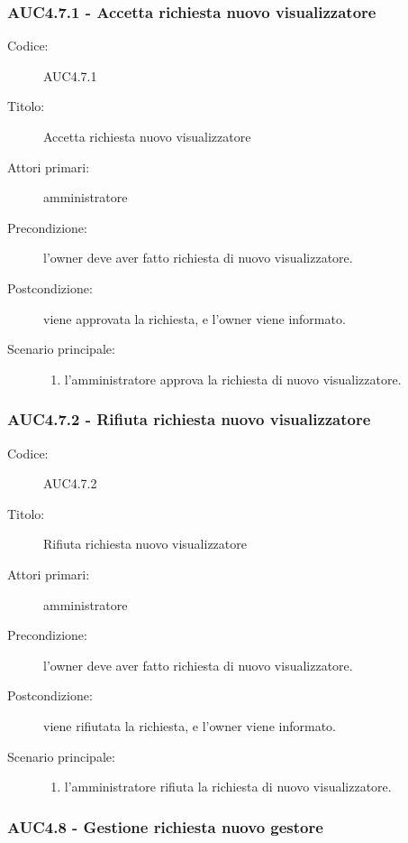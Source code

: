 \documentclass[casi-duso]{subfiles}
\begin{document}
\subsubsection{AUC4.7.1 - Accetta richiesta nuovo visualizzatore}%
\label{subsub:AUC4.7.1}
\begin{description}
  \item[Codice:] AUC4.7.1
  \item[Titolo:] Accetta richiesta nuovo visualizzatore
  \item[Attori primari:] amministratore
  \item[Precondizione:] l'owner deve aver fatto richiesta di nuovo visualizzatore.
  \item[Postcondizione:] viene approvata la richiesta, e l'owner viene informato.
  \item[Scenario principale:]
  \begin{enumerate}
    \item l'amministratore approva la richiesta di nuovo visualizzatore.
  \end{enumerate}
\end{description}  

\subsubsection{AUC4.7.2 - Rifiuta richiesta nuovo visualizzatore}%
\label{subsub:AUC4.7.2}
\begin{description}
  \item[Codice:] AUC4.7.2
  \item[Titolo:] Rifiuta richiesta nuovo visualizzatore
  \item[Attori primari:] amministratore
  \item[Precondizione:] l'owner deve aver fatto richiesta di nuovo visualizzatore.
  \item[Postcondizione:] viene rifiutata la richiesta, e l'owner viene informato.
  \item[Scenario principale:]
  \begin{enumerate}
    \item l'amministratore rifiuta la richiesta di nuovo visualizzatore.
  \end{enumerate}
\end{description}  

\subsubsection{AUC4.8 - Gestione richiesta nuovo gestore}%
\label{subsub:AUC4.8}
\end{document}
